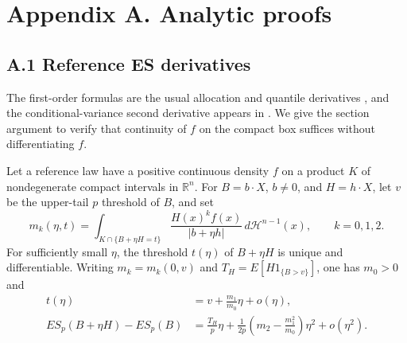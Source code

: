 \section{Appendix A. Analytic proofs}\label{app:analytic-proofs}
\subsection{A.1 Reference ES derivatives}
The first-order formulas are the usual allocation and quantile derivatives \cite{scaillet2004,tasche2001}, and the conditional-variance second derivative appears in \cite[Section~3.2]{martin2011}. We give the section argument to verify that continuity of \(f\) on the compact box suffices without differentiating \(f\).
\begin{lemma}\label{lem:general-variation}
Let a reference law have a positive continuous density \(f\) on a product \(K\) of nondegenerate compact intervals in \(\mathbb R^n\). For \(B=b\cdot X\), \(b\ne0\), and \(H=h\cdot X\), let \(v\) be the upper-tail \(p\) threshold of \(B\), and set
\[
m_k(\eta,t)=\int_{K\cap\{B+\eta H=t\}}
\frac{H(x)^k f(x)}{|b+\eta h|}\,d\mathcal H^{n-1}(x),
\qquad k=0,1,2.
\]
For sufficiently small \(\eta\), the threshold \(t(\eta)\) of \(B+\eta H\) is unique and differentiable. Writing \(m_k=m_k(0,v)\) and
\(T_H=E[H1_{\{B>v\}}]\), one has \(m_0>0\) and
\[
\begin{aligned}
t(\eta)&=v+\frac{m_1}{m_0}\eta+o(\eta),\\
ES_p(B+\eta H)-ES_p(B)
&=\frac{T_H}{p}\eta+
\frac1{2p}\left(m_2-\frac{m_1^2}{m_0}\right)\eta^2+o(\eta^2).
\end{aligned}
\]
\end{lemma}
